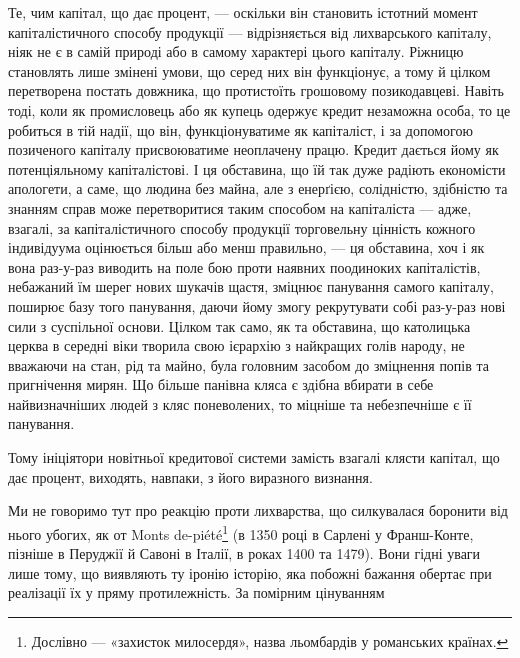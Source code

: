 Те, чим капітал, що дає процент, — оскільки він становить істотний момент
капіталістичного способу продукції — відрізняється від лихварського капіталу,
ніяк не є в самій природі або в самому характері цього капіталу. Ріжницю становлять
лише змінені умови, що серед них він функціонує, а тому й цілком
перетворена постать довжника, що протистоїть грошовому позикодавцеві. Навіть
тоді, коли як промисловець або як купець одержує кредит незаможна особа, то
це робиться в тій надії, що він, функціонуватиме як капіталіст, і за допомогою
позиченого капіталу присвоюватиме неоплачену працю. Кредит дається йому як
потенціяльному капіталістові. І ця обставина, що їй так дуже радіють економісти
апологети, а саме, що людина без майна, але з енерґією, солідністю, здібністю
та знанням справ може перетворитися таким способом на капіталіста — адже,
взагалі, за капіталістичного способу продукції торговельну цінність кожного
індивідуума оцінюється більш або менш правильно, — ця обставина, хоч і як
вона раз-у-раз виводить на поле бою проти наявних поодиноких капіталістів,
небажаний їм шерег нових шукачів щастя, зміцнює панування самого капіталу,
поширює базу того панування, даючи йому змогу рекрутувати собі раз-у-раз
нові сили з суспільної основи. Цілком так само, як та обставина, що католицька
церква в середні віки творила свою ієрархію з найкращих голів народу, не
вважаючи на стан, рід та майно, була головним засобом до зміцнення попів та
пригнічення мирян. Що більше панівна кляса є здібна вбирати в себе найвизначніших
людей з кляс поневолених, то міцніше та небезпечніше є її панування.

Тому ініціятори новітньої кредитової системи замість взагалі клясти капітал,
що дає процент, виходять, навпаки, з його виразного визнання.

Ми не говоримо тут про реакцію проти лихварства, що силкувалася боронити
від нього убогих, як от Monts de-piété\footnote*{
Дослівно — «захисток милосердя», назва льомбардів у романських країнах. 
} (в 1350 році в Сарлені у Франш-Конте,
пізніше в Перуджії й Савоні в Італії, в роках 1400 та 1479). Вони
гідні уваги лише тому, що виявляють ту іронію історію, яка побожні бажання
обертає при реалізації їх у пряму протилежність. За помірним цінуванням
\parbreak{}  %
